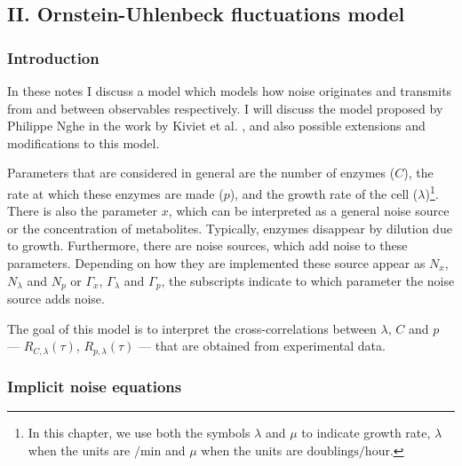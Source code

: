 


\subsection*{II. Ornstein-Uhlenbeck fluctuations model}

\subsubsection*{Introduction}

In these notes I discuss a model which models how noise originates and transmits from and between observables respectively. I will discuss the model proposed by Philippe Nghe in the work by Kiviet et al. \cite{Kiviet2014}, and also possible extensions and modifications to this model.

Parameters that are considered in general are the number of enzymes ($C$), the rate at which these enzymes are made ($p$), and the growth rate of the cell ($\lambda$)\footnote{
    In this chapter, we use both the symbols $\lambda$ and $\mu$ to indicate growth rate,
    $\lambda$ when the units are $/\text{min}$ and
    $\mu$ when the units are $\text{doublings}/\text{hour}$.}.
There is also the parameter $x$, which can be interpreted as a general noise source or the concentration of metabolites. Typically, enzymes disappear by dilution due to growth. Furthermore, there are noise sources, which add noise to these parameters. Depending on how they are implemented these source appear as $N_x$, $N_\lambda$ and $N_p$ or $\Gamma_x$, $\Gamma_\lambda$ and $\Gamma_p$, the subscripts indicate to which parameter the noise source adds noise.

The goal of this model is to interpret the cross-correlations between $\lambda$, $C$ and $p$ --- $R_{C,\lambda}(\tau)$, $R_{p,\lambda}(\tau)$ --- that are obtained from experimental data.

\subsubsection*{Implicit noise equations}


